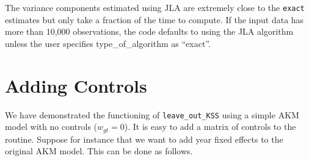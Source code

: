 \documentclass[11pt]{article}
\begin{document}
    The variance components estimated using JLA are extremely close to the
\texttt{exact} estimates but only take a fraction of the time to compute. If
the input data has more than 10,000 observations, the code defaults to using the
JLA algorithm unless the user specifies type\_of\_algorithm as
``exact''.

    \hypertarget{adding-controls}{%
\section{Adding Controls}\label{adding-controls}}

We have demonstrated the functioning of \texttt{leave\_out\_KSS} using a
simple AKM model with no controls (\(w_{gt}=0\)). It is easy to add a
matrix of controls to the routine. Suppose for instance that we want to
add year fixed effects to the original AKM model. This can be done as
follows.
\end{document}
